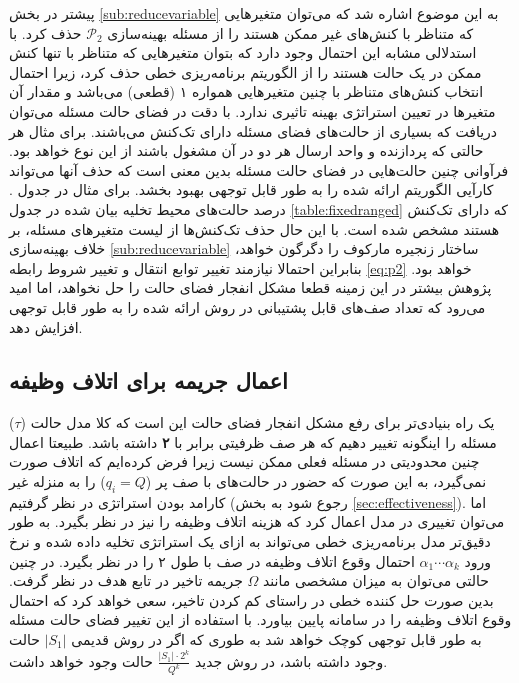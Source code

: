 پیشتر در بخش \ref{sub:reducevariable} به این موضوع اشاره شد که می‌توان متغیرهایی که متناظر با کنش‌های غیر ممکن هستند را از مسئله بهینه‌سازی 
 $\mathcal{P}_2$
 حذف کرد. با استدلالی مشابه این احتمال وجود دارد که بتوان متغیرهایی که متناظر با تنها کنش ممکن در یک حالت هستند را از الگوریتم برنامه‌ریزی خطی حذف کرد، زیرا احتمال انتخاب کنش‌های متناظر با چنین متغیرهایی همواره ۱ (قطعی) می‌باشد و مقدار آن متغیرها در تعیین استراتژی بهینه تاثیری ندارد. با دقت در فضای حالت مسئله می‌توان دریافت که بسیاری از حالت‌های فضای مسئله دارای تک‌کنش می‌باشند. برای مثال هر حالتی که پردازنده و واحد ارسال هر دو در آن مشغول باشند از این نوع خواهد بود. فرآوانی چنین حالت‌هایی در فضای حالت مسئله بدین معنی است که حذف آنها می‌تواند کارآیی الگوریتم ارائه شده را به طور قابل توجهی بهبود بخشد. برای مثال در جدول . درصد حالت‌های محیط تخلیه بیان شده در جدول \ref{table:fixedranged} که دارای تک‌کنش هستند مشخص شده است. با این حال حذف تک‌کنش‌ها از لیست متغیرهای مسئله، بر خلاف بهینه‌سازی \ref{sub:reducevariable} ساختار زنجیره مارکوف را دگرگون خواهد، بنابراین احتمالا نیازمند تغییر توابع انتقال و تغییر شروط رابطه \ref{eq:p2} خواهد بود. پژوهش بیشتر در این زمینه قطعا مشکل انفجار فضای حالت را حل نخواهد، اما امید می‌رود که تعداد صف‌های قابل پشتیبانی در روش ارائه شده را به طور قابل توجهی افزایش دهد.

\subsection{اعمال جریمه برای اتلاف وظیفه}
یک راه بنیادی‌تر برای رفع مشکل انفجار فضای حالت این است که کلا مدل حالت ($\tau$) مسئله را اینگونه تغییر دهیم که هر صف ظرفیتی برابر با \textbf{۲} داشته باشد. طبیعتا اعمال چنین محدودیتی در مسئله فعلی ممکن نیست زیرا فرض کرده‌ایم که اتلاف صورت نمی‌گیرد، به این صورت که حضور در حالت‌های با صف پر ($q_i = Q$) را به منزله غیر کارامد بودن استراتژی در نظر گرفتیم (رجوع شود به بخش \ref{sec:effectiveness}). اما می‌توان تغییری در مدل اعمال کرد که هزینه اتلاف وظیفه را نیز در نظر بگیرد. به طور دقیق‌تر مدل برنامه‌ریزی خطی می‌تواند به ازای یک استراتژی تخلیه داده شده و نرخ ورود $\alpha_1 \cdots \alpha_k$ احتمال وقوع اتلاف وظیفه در صف با طول ۲ را در نظر بگیرد. در چنین حالتی می‌توان به میزان مشخصی مانند $\Omega$ جریمه تاخیر در تابع هدف در نظر گرفت. بدین صورت حل کننده خطی در راستای کم کردن تاخیر، سعی خواهد کرد که احتمال وقوع اتلاف وظیفه را در سامانه پایین بیاورد. با استفاده از این تغییر فضای حالت مسئله به طور قابل توجهی کوچک خواهد شد به طوری که اگر در روش قدیمی $|S_1|$ حالت وجود داشته باشد، در روش جدید 
$\frac{|S_1| \cdot 2^k}{Q^k}$ 
حالت وجود خواهد داشت.
